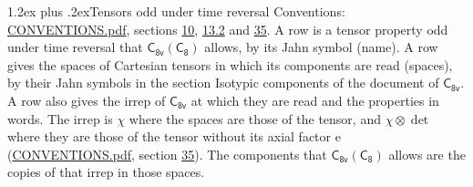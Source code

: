 \documentclass[10pt,a4paper]{article}
\makeatletter
\renewcommand\section{\@startsection{section}{1}{\z@}{-3ex plus -1ex minus -.2ex}%
  {1.2ex plus .2ex}{\normalfont\large\sffamily\bfseries\color{parttitle}}}
\numberwithin{equation}{section}
\newcommand{\grp}[1]{\mathsf{#1}}
\newcommand{\irrprod}{\otimes}
\makeatother
\begin{document}
\section{Tensors odd under time reversal}\label{s:time_odd}
Conventions: \href{../../CONVENTIONS.pdf}{CONVENTIONS.pdf}, sections \href{../../../rotation/CONVENTIONS.pdf\#conv.10}{10}, \href{../../../rotation/CONVENTIONS.pdf\#conv.13.2}{13.2} and \href{../../CONVENTIONS.pdf\#conv.35}{35}.
\leavevmode\label{n:head.name.property}A row is a tensor property odd under time reversal that $\grp{C_{8v}}(\grp{C_{8}})$ allows, by its Jahn symbol (name). \label{n:head.spaces}A row gives the spaces of Cartesian tensors in which its components are read (spaces), by their Jahn symbols in the section Isotypic components of the document of \href{../../../rotation/data/pdf/C8v.pdf}{$\grp{C_{8v}}$}. \label{n:head.properties}A row also gives the irrep of $\grp{C_{8v}}$ at which they are read and the properties in words. The irrep is $\chi$ where the spaces are those of the tensor, and $\chi \irrprod \det$ where they are those of the tensor without its axial factor e (\href{../../CONVENTIONS.pdf}{CONVENTIONS.pdf}, section \href{../../CONVENTIONS.pdf\#conv.35}{35}). The components that $\grp{C_{8v}}(\grp{C_{8}})$ allows are the copies of that irrep in those spaces.
\end{document}
